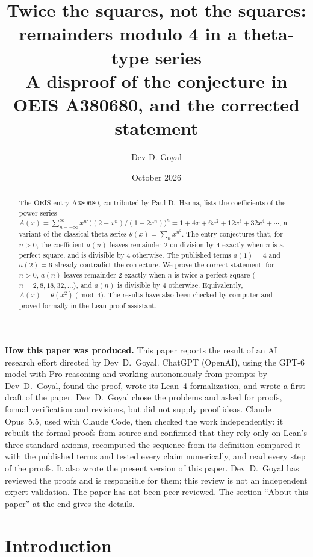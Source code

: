 \documentclass[11pt,a4paper]{article}
\title{Twice the squares, not the squares: remainders modulo 4 in a theta-type series\\[6pt]\large A disproof of the conjecture in OEIS A380680, and the corrected statement}
\author{Dev D. Goyal}
\date{October 2026}
\theoremstyle{definition}
\theoremstyle{remark}
\begin{document}
\maketitle
\begin{abstract}
The OEIS entry A380680, contributed by Paul D.~Hanna, lists the coefficients of the power series
$A(x)=\sum_{n=-\infty}^{\infty}x^{n^2}\bigl((2-x^n)/(1-2x^n)\bigr)^n=1+4x+6x^2+12x^3+32x^4+\cdots$, a variant of the
classical theta series $\theta(x)=\sum_nx^{n^2}$. The entry conjectures that, for $n>0$, the coefficient $a(n)$ leaves
remainder $2$ on division by $4$ exactly when $n$ is a perfect square, and is divisible by $4$ otherwise. The published
terms $a(1)=4$ and $a(2)=6$ already contradict the conjecture. We prove the correct statement: for $n>0$, $a(n)$ leaves remainder $2$ exactly when $n$ is twice a perfect square ($n=2,8,18,32,\dots$),
and $a(n)$ is divisible by $4$ otherwise. Equivalently, $A(x)\equiv\theta(x^2)\pmod 4$. The results have also been checked by computer and proved formally in the Lean proof assistant.
\end{abstract}
\begin{center}\begin{minipage}{0.88\linewidth}\small
\textbf{How this paper was produced.} This paper reports the result of an AI research effort directed by
Dev~D.~Goyal. ChatGPT (OpenAI), using the GPT-6 model with Pro reasoning and working autonomously from prompts by
Dev~D.~Goyal, found the proof, wrote its Lean~4 formalization, and wrote a first draft of the paper.
Dev~D.~Goyal chose the problems and asked for proofs, formal verification and revisions, but did not supply proof
ideas. Claude Opus~5.5, used with Claude Code, then checked the work independently: it rebuilt the formal proofs from
source and confirmed that they rely only on Lean's three standard axioms, recomputed the sequence from its definition
compared it with the published terms and tested every claim numerically, and read every step of the proofs. It also wrote the present
version of this paper.
Dev~D.~Goyal has reviewed the proofs and is responsible for them; this review is not an independent expert validation.
The paper has not been peer reviewed.
The section ``About this paper'' at the end gives the details.
\end{minipage}\end{center}

\section{Introduction}
\end{document}
